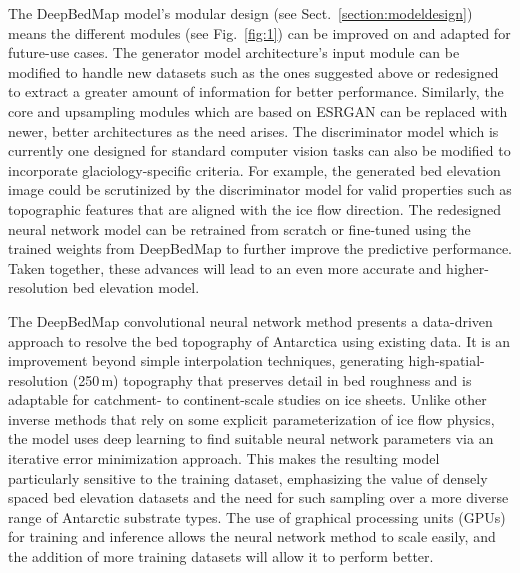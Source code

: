 \documentclass[tc, noline]{copernicus}
\begin{document}
The DeepBedMap model's modular design (see Sect.~\ref{section:modeldesign}) means the different modules (see Fig.~\ref{fig:1}) can be improved on and
adapted for future-use cases. The generator model architecture's input module can be modified to handle new datasets such as the ones suggested above
or redesigned to extract a greater amount of information for better performance. Similarly, the core and upsampling modules which are based on ESRGAN
\citep{WangESRGANEnhancedSuperResolution2019} can be replaced with newer, better architectures as the need arises. The discriminator model which is
currently one designed for standard computer vision tasks can also be modified to incorporate glaciology-specific criteria. For example, the generated
bed elevation image could be scrutinized by the discriminator model for valid properties such as topographic features that are aligned with the
ice flow direction. The redesigned neural network model can be retrained from scratch or fine-tuned using the trained weights from DeepBedMap to
further improve the predictive performance. Taken together, these advances will lead to an even more accurate and higher-resolution bed elevation
model.


\conclusions

The DeepBedMap convolutional neural network method presents a data-driven approach to resolve the bed topography of Antarctica using existing data. It
is an improvement beyond simple interpolation techniques, generating high-spatial-resolution (250\,\unit{m}) topography that preserves detail in bed
roughness and is adaptable for catchment- to continent-scale studies on ice sheets. Unlike other inverse methods that rely on some explicit
parameterization of ice flow physics, the model uses deep learning to find suitable neural network parameters via an iterative error minimization
approach. This makes the resulting model particularly sensitive to the training dataset, emphasizing the value of densely spaced bed elevation
datasets and the need for such sampling over a more diverse range of Antarctic substrate types. The use of graphical processing units (GPUs) for
training and inference allows the neural network method to scale easily, and the addition of more training datasets will allow it to perform better.
\end{document}
